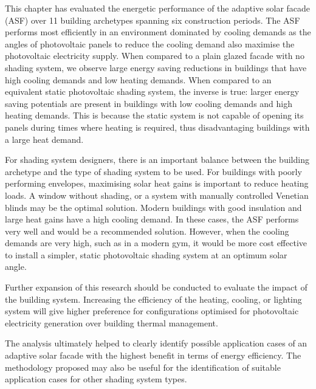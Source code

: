 
This chapter has evaluated the energetic performance of the adaptive solar facade (ASF) over 11 building archetypes spanning six construction periods. The ASF performs most efficiently in an environment dominated by cooling demands as the angles of photovoltaic panels to reduce the cooling demand also maximise the photovoltaic electricity supply. When compared to a plain glazed facade with no shading system, we observe large energy saving reductions in buildings that have high cooling demands and low heating demands. When compared to an equivalent static photovoltaic shading system, the inverse is true: larger energy saving potentials are present in buildings with low cooling demands and high heating demands. This is because the static system is not capable of opening its panels during times where heating is required, thus disadvantaging buildings with a large heat demand. 

For shading system designers, there is an important balance between the building archetype and the type of shading system to be used. For buildings with poorly performing envelopes, maximising solar heat gains is important to reduce heating loads. A window without shading, or a system with manually controlled Venetian blinds may be the optimal solution. Modern buildings with good insulation and large heat gains have a high cooling demand. In these cases, the ASF performs very well and would be a recommended solution. However, when the cooling demands are very high, such as in a modern gym, it would be more cost effective to install a simpler, static photovoltaic shading system at an optimum solar angle. 

Further expansion of this research should be conducted to evaluate the impact of the building system. Increasing the efficiency of the heating, cooling, or lighting system will give higher preference for configurations optimised for photovoltaic electricity generation over building thermal management. 

The analysis ultimately helped to clearly identify possible application cases of an adaptive solar facade with the highest benefit in terms of energy efficiency. The methodology proposed may also be useful for the identification of suitable application cases for other shading system types. 
